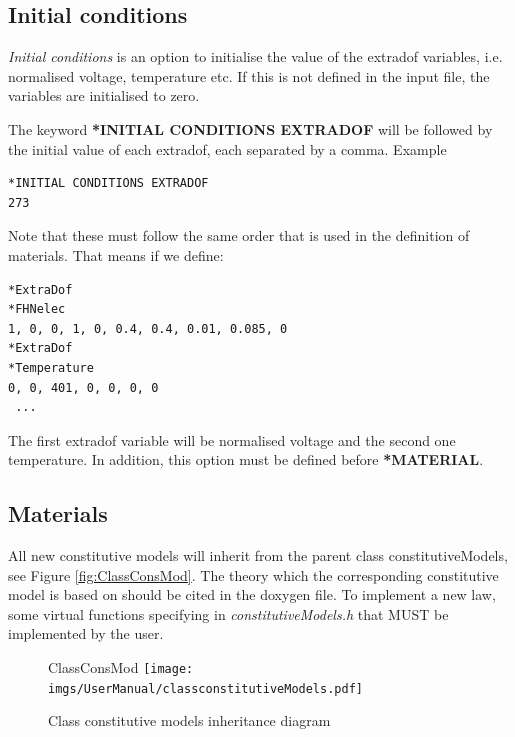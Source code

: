 \documentclass[oneside,11pt,times]{book}
\begin{document}
\subsection{Initial conditions}\label{secInitialConditions}
\textit{Initial conditions} is an option to initialise the value of the  extradof variables, i.e. normalised voltage, temperature etc. If this is not defined in the input file, the variables are initialised to zero.

The keyword \textbf{*INITIAL CONDITIONS EXTRADOF} will be followed by the initial value of each extradof, each separated by a comma.
Example
\begin{lstlisting}
*INITIAL CONDITIONS EXTRADOF
273
\end{lstlisting}

Note that these must follow the same order that is used in the definition of materials. That means if we define:
\begin{lstlisting}
*ExtraDof
*FHNelec
1, 0, 0, 1, 0, 0.4, 0.4, 0.01, 0.085, 0
*ExtraDof
*Temperature
0, 0, 401, 0, 0, 0, 0
 ...
\end{lstlisting}
The first extradof variable will be normalised voltage and the second one temperature.
In addition, this option must be defined before \textbf{*MATERIAL}.

\subsection{Materials}\label{secMaterials}
All new constitutive models will inherit from the parent class constitutiveModels, see Figure \ref{fig:ClassConsMod}. The theory which the corresponding constitutive model is based on should be cited in the doxygen file. To implement a new law, some virtual functions specifying in \textit{constitutiveModels.h} that MUST be implemented by the user.

\begin{figure}[htb]
   ClassConsMod \centering
    \texttt{[image: imgs/UserManual/classconstitutiveModels.pdf]}
    \caption{Class constitutive models inheritance diagram}
    \label{fig:}
\end{figure}
\end{document}
